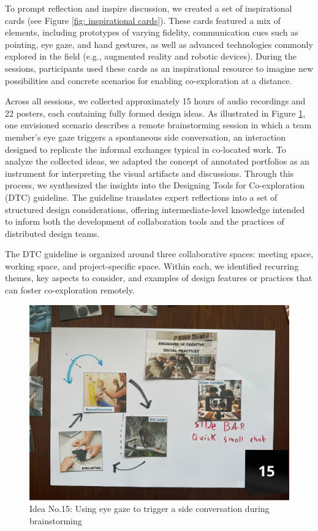 \documentclass[11pt]{article}
\begin{document}
To prompt reflection and inspire discussion, we created a set of inspirational cards (see Figure \ref{fig: inspirational cards}). These cards featured a mix of elements, including prototypes of varying fidelity, communication cues such as pointing, eye gaze, and hand gestures, as well as advanced technologies commonly explored in the field (e.g., augmented reality and robotic devices). During the sessions, participants used these cards as an inspirational resource to imagine new possibilities and concrete scenarios for enabling co-exploration at a distance.

Across all sessions, we collected approximately 15 hours of audio recordings and 22 posters, each containing fully formed design ideas. As illustrated in Figure \ref{fig: side talk}, one envisioned scenario describes a remote brainstorming session in which a team member’s eye gaze triggers a spontaneous side conversation, an interaction designed to replicate the informal exchanges typical in co-located work. To analyze the collected ideas,  we adapted the concept of annotated portfolios \cite{sauerwein2018annotated} as an instrument for interpreting the visual artifacts and discussions. Through this process, we synthesized the insights into the Designing Tools for Co-exploration (DTC) guideline. The guideline translates expert reflections into a set of structured design considerations, offering intermediate-level knowledge \cite{hook2012strong} intended to inform both the development of collaboration tools and the practices of distributed design teams.

The DTC guideline is organized around three collaborative spaces: meeting space, working space, and project-specific space. Within each, we identified recurring themes, key aspects to consider, and examples of design features or practices that can foster co-exploration remotely. 

\begin{figure}[h]
    \centering
    \includegraphics[width=0.7\linewidth]{figures/side_talk.jpg}
    \caption{Idea No.15: Using eye gaze to trigger a side conversation during brainstorming}
    \label{fig: side talk}
\end{figure}
\end{document}
